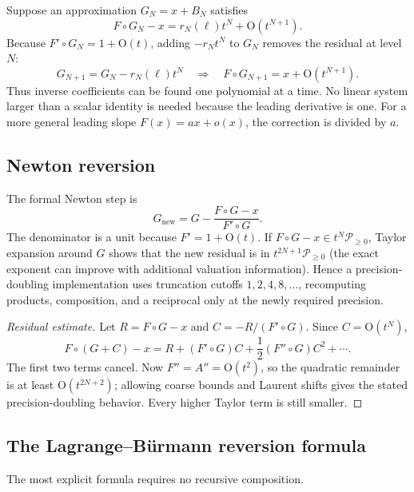 \documentclass[11pt,oneside]{article}
\numberwithin{equation}{section}
\theoremstyle{definition}
\newcommand{\PL}{\mathscr P}
\newcommand{\bigO}{\mathrm{O}}
\begin{document}
Suppose an approximation \(G_N=x+B_N\) satisfies
\begin{equation}\label{eq:residual-order-N}
  F\circ G_N-x=r_N(\ell)t^N+\bigO(t^{N+1}).
\end{equation}
Because \(F'\circ G_N=1+\bigO(t)\), adding
\(-r_Nt^N\) to \(G_N\) removes the residual at level \(N\):
\begin{equation}\label{eq:triangular-update}
  G_{N+1}=G_N-r_N(\ell)t^N
  \quad\Longrightarrow\quad
  F\circ G_{N+1}=x+\bigO(t^{N+1}).
\end{equation}
Thus inverse coefficients can be found one polynomial at a time.  No linear
system larger than a scalar identity is needed because the leading derivative is
one.  For a more general leading slope \(F(x)=ax+o(x)\), the correction is divided
by \(a\).

\subsection{Newton reversion}

The formal Newton step is
\begin{equation}\label{eq:newton-reversion}
\boxed{
  G_{\mathrm{new}}
  =G-\frac{F\circ G-x}{F'\circ G}.
}
\end{equation}
The denominator is a unit because \(F'=1+\bigO(t)\).  If
\(F\circ G-x\in t^N\PL_{\ge0}\), Taylor expansion around \(G\) shows that the
new residual is in \(t^{2N+1}\PL_{\ge0}\) (the exact exponent can improve with
additional valuation information).  Hence a precision-doubling implementation
uses truncation cutoffs
\(1,2,4,8,\ldots\), recomputing products, composition, and a reciprocal only at
the newly required precision.

\begin{proof}[Residual estimate]
Let \(R=F\circ G-x\) and \(C=-R/(F'\circ G)\).  Since \(C=\bigO(t^N)\),
\[
 F\circ(G+C)-x
 =R+(F'\circ G)C+\frac12(F''\circ G)C^2+\cdots.
\]
The first two terms cancel.  Now \(F''=A''=\bigO(t^2)\), so the quadratic
remainder is at least \(\bigO(t^{2N+2})\); allowing coarse bounds and Laurent
shifts gives the stated precision-doubling behavior.  Every higher Taylor term
is still smaller.
\end{proof}

\subsection{The Lagrange--B\"urmann reversion formula}

The most explicit formula requires no recursive composition.
\end{document}
